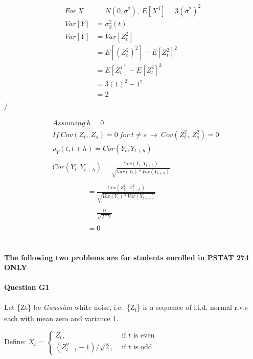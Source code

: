 \documentclass[
]{article}
\begin{document}
\[
\begin{aligned}
For\ X &= N(0,\sigma^2),\ E[X^4]=3(\sigma^2)^2\\
Var[Y] & = \sigma^2_{y}(t)\\
Var[Y] & = Var[Z_{t}^2]\\
& = E[(Z_{t}^2)^2]-E[Z_{t}^2]^2\\
& = E[Z_{t}^4]-E[Z_{t}^2]^2\\
& = 3(1)^2 - 1^2\\
& = 2\\
\end{aligned}
\]/

\[
\begin{aligned}
& Assuming\ h=0\\
& If\ Cov(Z_{t},\ Z_{s})=0\ for\ t \ne s\ \rightarrow\ Cov(Z^2_{t},\ Z^2_{s})=0\\
&\rho_{Y}(t, t+h)=Cor(Y_{t}, Y_{t+h})\\ \\
&Cor(Y_{t}, Y_{t+h}) = \frac{Cov(Y_{t}, Y_{t+h})}{\sqrt{Var(Y_{t})*Var(Y_{t+h})}}\\ \\
& \ \ \ \ \ \ \ \ \ \ \ \ \ \ \ \ \ \ \ \ \ \ = \frac{Cov(Z^2_{t},\ Z^2_{t+h})}{\sqrt{Var(Y_{t})*Var(Y_{t+h})}}\\ \\
& \ \ \ \ \ \ \ \ \ \ \ \ \ \ \ \ \ \ \ \ \ \  = \frac{0}{\sqrt{2*2}}\\ \\
& \ \ \ \ \ \ \ \ \ \ \ \ \ \ \ \ \ \ \ \ \ \  = 0
\end{aligned}
\]\\

\setlength{\leftskip}{0cm}\\

\textbf{The following two problems are for students enrolled in PSTAT
274 ONLY}\\

\hypertarget{question-g1}{%
\paragraph{Question G1}\label{question-g1}}

Let \{Zt\} be \emph{Gaussian} white noise, i.e.~\{Z\textsubscript{t}\}
is a sequence of i.i.d. normal r.v.s each with mean zero and variance 1.

\setlength{\leftskip}{2cm}

Define:
\(X_t= \begin{cases}Z_t, & \text { if } t \text { is even } \\ \left(Z_{t-1}^2-1\right) / \sqrt{2}, & \text { if } t \text { is odd }\end{cases}\)
\end{document}
